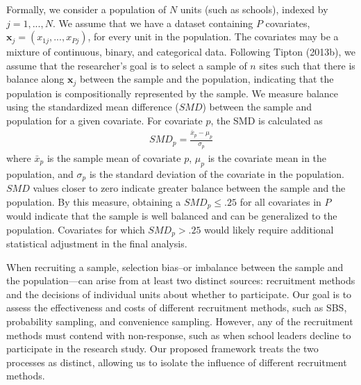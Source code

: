 \documentclass[
  english,
  man,floatsintext]{apa6}
\begin{document}
Formally, we consider a population of \(N\) units (such as schools), indexed by \(j = 1,...,N\).
We assume that we have a dataset containing \(P\) covariates, \(\mathbf{x}_j = \left(x_{1j},...,x_{Pj}\right)\), for every unit in the population. The covariates may be a mixture of continuous, binary, and categorical data.
Following Tipton (2013b), we assume that the researcher's goal is to select a sample of \(n\) sites such that there is balance along \(\mathbf{x}_j\) between the sample and the population, indicating that the population is compositionally represented by the sample.
We measure balance using the standardized mean difference (\(SMD\)) between the sample and population for a given covariate. For covariate \(p\), the SMD is calculated as
\begin{align} \label{eq:SMD}
SMD_p = \frac{\bar{x}_p - \mu_p}{\sigma_p}
\end{align}
where \(\bar{x}_p\) is the sample mean of covariate \(p\), \(\mu_p\) is the covariate mean in the population, and \(\sigma_p\) is the standard deviation of the covariate in the population. \(SMD\) values closer to zero indicate greater balance between the sample and the population. By this measure, obtaining a \(SMD_p \le .25\) for all covariates in \(P\) would indicate that the sample is well balanced and can be generalized to the population. Covariates for which \(SMD_p > .25\) would likely require additional statistical adjustment in the final analysis.

When recruiting a sample, selection bias--or imbalance between the sample and the population---can arise from at least two distinct sources: recruitment methods and the decisions of individual units about whether to participate. Our goal is to assess the effectiveness and costs of different recruitment methods, such as SBS, probability sampling, and convenience sampling. However, any of the recruitment methods must contend with non-response, such as when school leaders decline to participate in the research study.
Our proposed framework treats the two processes as distinct, allowing us to isolate the influence of different recruitment methods.
\end{document}
